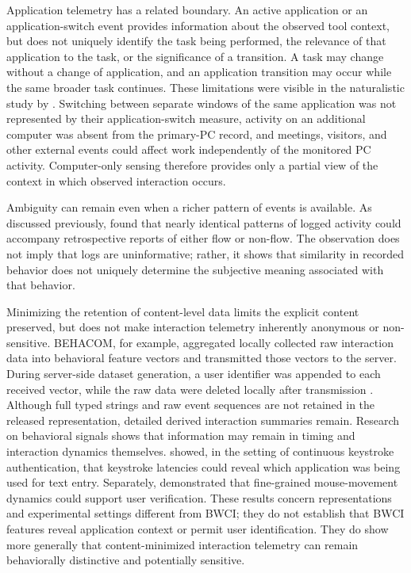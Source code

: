 Application telemetry has a related boundary. An active application or an application-switch event provides information about the observed tool context, but does not uniquely identify the task being performed, the relevance of that application to the task, or the significance of a transition. A task may change without a change of application, and an application transition may occur while the same broader task continues. These limitations were visible in the naturalistic study by \textcite{shiratori2020workContinuance}. Switching between separate windows of the same application was not represented by their application-switch measure, activity on an additional computer was absent from the primary-PC record, and meetings, visitors, and other external events could affect work independently of the monitored PC activity. Computer-only sensing therefore provides only a partial view of the context in which observed interaction occurs.

Ambiguity can remain even when a richer pattern of events is available. As discussed previously, \textcite{brown2023focusedWork} found that nearly identical patterns of logged activity could accompany retrospective reports of either flow or non-flow. The observation does not imply that logs are uninformative; rather, it shows that similarity in recorded behavior does not uniquely determine the subjective meaning associated with that behavior.

Minimizing the retention of content-level data limits the explicit content preserved, but does not make interaction telemetry inherently anonymous or non-sensitive. BEHACOM, for example, aggregated locally collected raw interaction data into behavioral feature vectors and transmitted those vectors to the server. During server-side dataset generation, a user identifier was appended to each received vector, while the raw data were deleted locally after transmission \parencite{sanchez2020behacom}. Although full typed strings and raw event sequences are not retained in the released representation, detailed derived interaction summaries remain. Research on behavioral signals shows that information may remain in timing and interaction dynamics themselves. \textcite{balagani2018contextPrivacy} showed, in the setting of continuous keystroke authentication, that keystroke latencies could reveal which application was being used for text entry. Separately, \textcite{zheng2011mouseVerification} demonstrated that fine-grained mouse-movement dynamics could support user verification. These results concern representations and experimental settings different from BWCI; they do not establish that BWCI features reveal application context or permit user identification. They do show more generally that content-minimized interaction telemetry can remain behaviorally distinctive and potentially sensitive.

